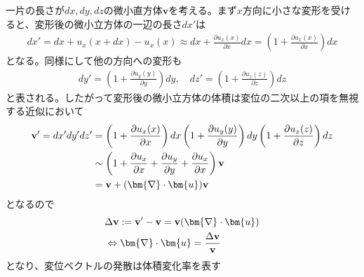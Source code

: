 \documentclass[dvipdfmx, 11pt, a4paper]{jsarticle}
\numberwithin{equation}{section}
\theoremstyle{definition}
\begin{document}
    \begin{derivationBox}
        一片の長さが$dx,dy,dz$の微小直方体$\mathbf{v}$を考える。まず$x$方向に小さな変形を受けると、変形後の微小立方体の一辺の長さ$dx'$は
        \begin{align}
            dx' = dx + u_x(x+dx) -u_x(x) \approx dx + \frac{\partial u_x(x)}{\partial x}dx = \left( 1 + \frac{\partial u_x(x)}{\partial x} \right)dx
        \end{align}
        となる。同様にして他の方向への変形も
        \begin{align}
            dy' = \left( 1 + \frac{\partial u_y(y)}{\partial y} \right)dy ,\quad dz' =  \left( 1 + \frac{\partial u_z(z)}{\partial z} \right)dz
        \end{align}
        と表される。したがって変形後の微小立方体の体積は変位の二次以上の項を無視する近似において
        \begin{align}
            \mathbf{v}' = dx'dy'dz' &= \left( 1 + \frac{\partial u_x(x)}{\partial x} \right)dx\left( 1 + \frac{\partial u_y(y)}{\partial y} \right)dy\left( 1 + \frac{\partial u_z(z)}{\partial z} \right)dz \notag \\
            &\sim \left( 1 + \frac{\partial u_x}{\partial x} + \frac{\partial u_y}{\partial y} + \frac{\partial u_x}{\partial x} \right) \mathbf{v} \notag \\
            &= \mathbf{v} + (\bm{\nabla} \cdot \bm{u})\mathbf{v}
        \end{align}
        となるので
        \begin{align}
            &\Delta \mathbf{v} := \mathbf{v}' - \mathbf{v} = \mathbf{v} (\bm{\nabla} \cdot \bm{u}) \notag \\
            &\Leftrightarrow \bm{\nabla} \cdot \bm{u} = \frac{\Delta \mathbf{v}}{\mathbf{v}}
        \end{align}
        となり、変位ベクトルの発散は体積変化率を表す
    \end{derivationBox}
\end{document}
